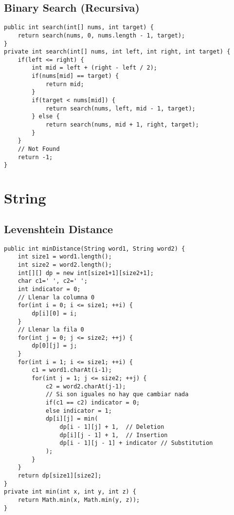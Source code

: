 \documentclass[10pt,letterpaper,twocolumn,twosided]{article}
\begin{document}
\subsection{Binary Search (Recursiva)}
\begin{lstlisting}
public int search(int[] nums, int target) {
    return search(nums, 0, nums.length - 1, target);
}
private int search(int[] nums, int left, int right, int target) {
    if(left <= right) {
        int mid = left + (right - left / 2);
        if(nums[mid] == target) {
            return mid;
        }
        if(target < nums[mid]) {
            return search(nums, left, mid - 1, target);
        } else {
            return search(nums, mid + 1, right, target);
        }
    }
    // Not Found
    return -1;
}
\end{lstlisting}







\section{String}



\subsection{Levenshtein Distance}
\begin{lstlisting}
public int minDistance(String word1, String word2) {
    int size1 = word1.length();
    int size2 = word2.length();
    int[][] dp = new int[size1+1][size2+1];
    char c1=' ', c2=' ';
    int indicator = 0;
    // Llenar la columna 0
    for(int i = 0; i <= size1; ++i) {
        dp[i][0] = i;
    }
    // Llenar la fila 0
    for(int j = 0; j <= size2; ++j) {
        dp[0][j] = j;
    }
    for(int i = 1; i <= size1; ++i) {
        c1 = word1.charAt(i-1);
        for(int j = 1; j <= size2; ++j) {
            c2 = word2.charAt(j-1);
            // Si son iguales no hay que cambiar nada
            if(c1 == c2) indicator = 0;
            else indicator = 1;
            dp[i][j] = min(
                dp[i - 1][j] + 1,  // Deletion
                dp[i][j - 1] + 1,  // Insertion
                dp[i - 1][j - 1] + indicator // Substitution
            );
        }
    }   
    return dp[size1][size2];
}
private int min(int x, int y, int z) {
    return Math.min(x, Math.min(y, z));
}
\end{lstlisting}
\end{document}
